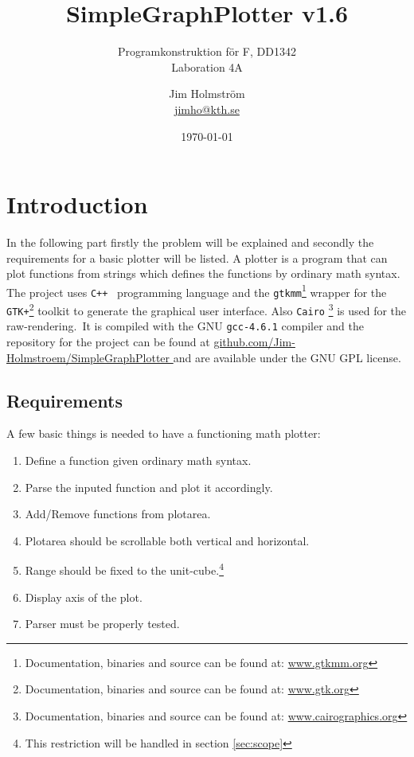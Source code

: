 \documentclass[a4paper,11pt]{kth-mag}
\title{SimpleGraphPlotter v1.6}
\subtitle{Programkonstruktion f\"{o}r F, DD1342\\ Laboration 4A}
\author{Jim Holmstr\"{o}m\\\href{mailto:jimho@kth.se}{jimho@kth.se}}
\date{\today}
\newcommand{\Cpp}{\texttt{C++}}
\newcommand{\Gtkmm}{\texttt{gtkmm}}
\newcommand{\Gtk}{\texttt{GTK+}}
\newcommand{\Cairo}{\texttt{Cairo}}
\begin{document}
\frontmatter
\pagestyle{empty}
\removepagenumbers
\maketitle
{}
\tableofcontents*
\mainmatter
\pagestyle{newchap}

\chapter{Introduction}
In the following part firstly the problem will be explained and secondly 
the requirements for a basic plotter will be listed.
A plotter is a program that can plot functions from strings which defines the 
functions by ordinary math syntax. 
The project uses \Cpp~ programming language and the 
\Gtkmm\footnote{Documentation, binaries and source can be found at: 
\href{http://www.gtkmm.org}{www.gtkmm.org}} wrapper for the 
\Gtk\footnote{Documentation, binaries and source can be found at: 
\href{http://www.gtk.org}{www.gtk.org}} toolkit to generate the graphical user interface.
Also \Cairo
\footnote{Documentation, binaries and source can be found at:
\href{http://www.cairographics.org/}{www.cairographics.org}
}
is used for the raw-rendering.\
It is compiled with the GNU \texttt{gcc-4.6.1} compiler and the repository for
the project can be found at
\href{
    https://github.com/Jim-Holmstroem/SimpleGraphPlotter
}{
    github.com/Jim-Holmstroem/SimpleGraphPlotter
} and are available under the GNU GPL license.

\section{Requirements}
\label{sec:requirements}
A few basic things is needed to have a functioning math plotter:
\begin{enumerate}
\item Define a function given ordinary math syntax.
\item Parse the inputed function and plot it accordingly.
\item Add/Remove functions from plotarea.
\item Plotarea should be scrollable both vertical and horizontal.
\item Range should be fixed to the unit-cube.\footnote{This restriction will be handled in section \ref{sec:scope}}
\item Display axis of the plot.
\item Parser must be properly tested.
\end{enumerate}
\end{document}
